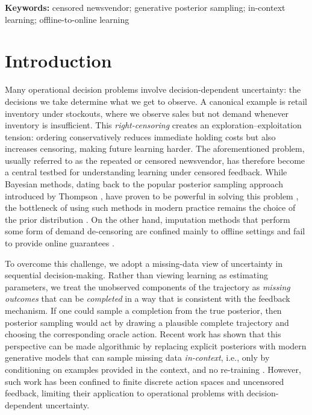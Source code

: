 \documentclass[11pt]{article}
\begin{document}
\par\medskip
\noindent\textbf{Keywords:} censored newsvendor; generative posterior sampling; in-context learning; offline-to-online learning
\endgroup


\section{Introduction}
\label{sec:intro}

Many operational decision problems involve decision-dependent uncertainty: the decisions we take determine what we get to observe. A canonical example is retail inventory under stockouts, where we observe sales but not demand whenever inventory is insufficient. This \emph{right-censoring} creates an exploration--exploitation tension: ordering conservatively reduces immediate holding costs but also increases censoring, making future learning harder. The aforementioned problem, usually referred to as the repeated or censored newsvendor, has therefore become a central testbed for understanding learning under censored feedback.
While Bayesian methods, dating back to the popular posterior sampling approach introduced by Thompson \cite{thompson1933likelihood}, have proven to be powerful in solving this problem \cite{zhang2025thompson}, the bottleneck of using such methods in modern practice remains the choice of the prior distribution \cite{xu2025bayesian}. On the other hand, imputation methods that perform some form of demand de-censoring are confined mainly to offline settings and fail to provide online guarantees \cite{clausen2025iterative}.







To overcome this challenge, we adopt a missing-data view of uncertainty in sequential decision-making.
Rather than viewing learning as estimating parameters, we treat the unobserved components of the trajectory as \emph{missing outcomes} that can be \emph{completed} in a way that is consistent with the feedback mechanism.
If one could sample a completion from the true posterior, then posterior sampling would act by drawing a plausible complete
trajectory and choosing the corresponding oracle action. Recent work has shown that this perspective can be made algorithmic by replacing explicit posteriors with modern generative models that can sample missing data \emph{in-context}, i.e., only by conditioning on examples provided in the context, and no re-training \citep{cai2024active, zhang2025contextual}. However, such work has been confined to finite discrete action spaces and uncensored feedback, limiting their application to operational problems with decision-dependent uncertainty.
\end{document}
